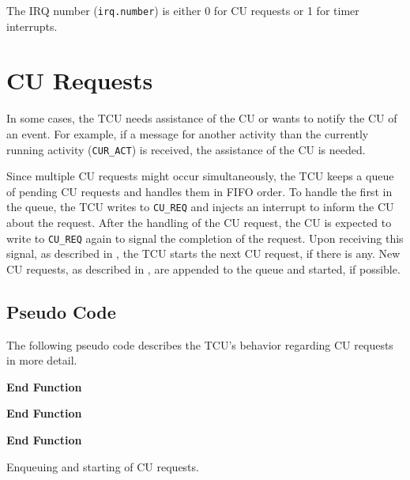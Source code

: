 The IRQ number (\texttt{irq.number}) is either 0 for CU requests or 1 for timer interrupts.
\extend{}

\section{CU Requests}

In some cases, the TCU needs assistance of the CU or wants to notify the CU of an event. For
example, if a message for another activity than the currently running activity (\texttt{CUR\_ACT})
is received, the assistance of the CU is needed.

Since multiple CU requests might occur simultaneously, the TCU keeps a queue of pending CU requests
and handles them in FIFO order. To handle the first in the queue, the TCU writes to \texttt{CU\_REQ}
and injects an interrupt to inform the CU about the request. After the handling of the CU request,
the CU is expected to write to \texttt{CU\_REQ} again to signal the completion of the request. Upon
receiving this signal, as described in , the TCU starts the next CU request,
if there is any. New CU requests, as described in , are appended to the queue
and started, if possible.

\subsection{Pseudo Code}

The following pseudo code describes the TCU's behavior regarding CU requests in more detail.

\begin{algorithm}[H]
    \textbf{End Function}
    \BlankLine

    \textbf{End Function}
    \BlankLine

    \textbf{End Function}
    \caption{Enqueuing and starting of CU requests.}
    \label{code:cureqstart}
\end{algorithm}

